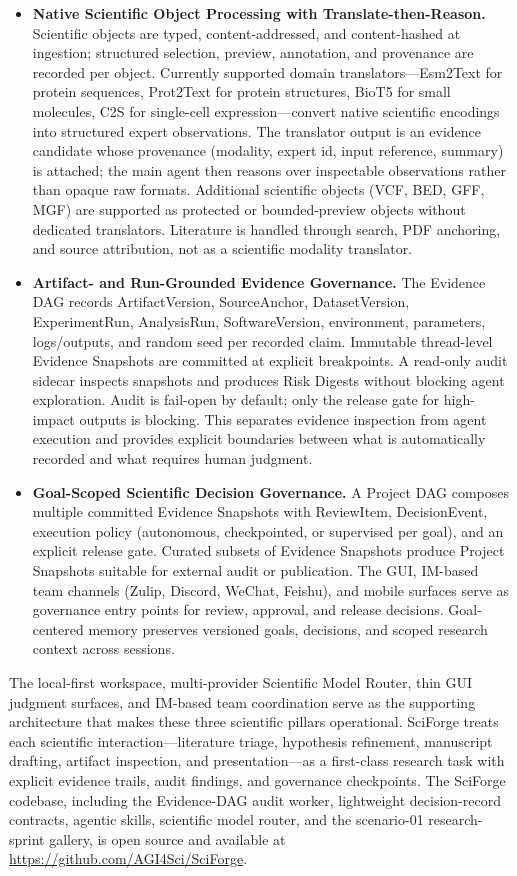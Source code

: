 \documentclass[sn-basic,Numbered,pdflatex]{sn-jnl}
\begin{document}
\begin{itemize}
    \item \textbf{Native Scientific Object Processing with Translate-then-Reason.} Scientific objects are typed, content-addressed, and content-hashed at ingestion; structured selection, preview, annotation, and provenance are recorded per object. Currently supported domain translators---Esm2Text for protein sequences, Prot2Text for protein structures, BioT5 for small molecules, C2S for single-cell expression---convert native scientific encodings into structured expert observations. The translator output is an evidence candidate whose provenance (modality, expert id, input reference, summary) is attached; the main agent then reasons over inspectable observations rather than opaque raw formats. Additional scientific objects (VCF, BED, GFF, MGF) are supported as protected or bounded-preview objects without dedicated translators. Literature is handled through search, PDF anchoring, and source attribution, not as a scientific modality translator.
    \item \textbf{Artifact- and Run-Grounded Evidence Governance.} The Evidence DAG records ArtifactVersion, SourceAnchor, DatasetVersion, ExperimentRun, AnalysisRun, SoftwareVersion, environment, parameters, logs/outputs, and random seed per recorded claim. Immutable thread-level Evidence Snapshots are committed at explicit breakpoints. A read-only audit sidecar inspects snapshots and produces Risk Digests without blocking agent exploration. Audit is fail-open by default; only the release gate for high-impact outputs is blocking. This separates evidence inspection from agent execution and provides explicit boundaries between what is automatically recorded and what requires human judgment.
    \item \textbf{Goal-Scoped Scientific Decision Governance.} A Project DAG composes multiple committed Evidence Snapshots with ReviewItem, DecisionEvent, execution policy (autonomous, checkpointed, or supervised per goal), and an explicit release gate. Curated subsets of Evidence Snapshots produce Project Snapshots suitable for external audit or publication. The GUI, IM-based team channels (Zulip, Discord, WeChat, Feishu), and mobile surfaces serve as governance entry points for review, approval, and release decisions. Goal-centered memory preserves versioned goals, decisions, and scoped research context across sessions.
\end{itemize}

The local-first workspace, multi-provider Scientific Model Router, thin GUI judgment surfaces, and IM-based team coordination serve as the supporting architecture that makes these three scientific pillars operational. SciForge treats each scientific interaction---literature triage, hypothesis refinement, manuscript drafting, artifact inspection, and presentation---as a first-class research task with explicit evidence trails, audit findings, and governance checkpoints. The SciForge codebase, including the Evidence-DAG audit worker, lightweight decision-record contracts, agentic skills, scientific model router, and the scenario-01 research-sprint gallery, is open source and available at \url{https://github.com/AGI4Sci/SciForge}.
\end{document}
